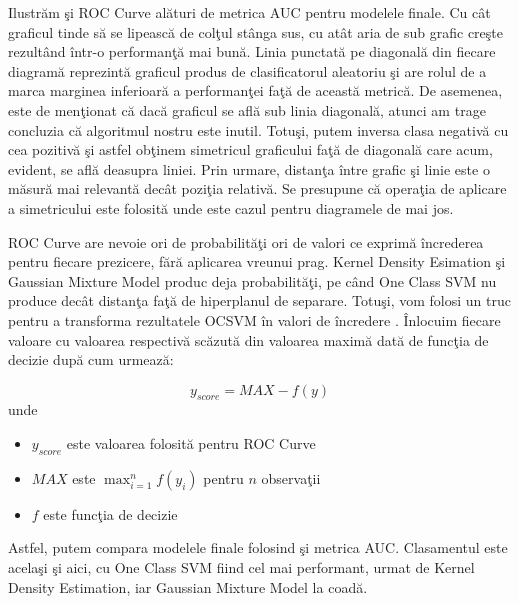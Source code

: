 Ilustrăm şi ROC Curve alături de metrica AUC pentru modelele finale. Cu cât graficul 
tinde să se lipească de colţul stânga sus, cu atât aria de sub grafic creşte rezultând 
într-o performanţă mai bună. Linia punctată pe diagonală 
din fiecare diagramă reprezintă graficul produs de clasificatorul aleatoriu şi are rolul
de a marca marginea inferioară a performanţei faţă de această metrică. De asemenea, este 
de menţionat că dacă graficul se află sub linia diagonală, atunci am trage concluzia că
algoritmul nostru este inutil. Totuşi, putem inversa clasa negativă cu cea pozitivă şi 
astfel obţinem simetricul graficului faţă de diagonală care acum, evident, se află deasupra
liniei. Prin urmare, distanţa între grafic şi linie este o măsură mai relevantă decât poziţia
relativă. Se presupune că operaţia de aplicare a simetricului este folosită unde este cazul 
pentru diagramele de mai jos.

ROC Curve are nevoie ori de probabilităţi ori de valori ce exprimă încrederea pentru fiecare 
prezicere, fără aplicarea vreunui prag. Kernel Density Esimation şi Gaussian Mixture Model 
produc deja probabilităţi, pe când One Class SVM nu produce decât distanţa faţă de hiperplanul
de separare. Totuşi, vom folosi un truc pentru a transforma rezultatele OCSVM în valori 
de încredere \cite{stackoverflow-auc}. Înlocuim fiecare valoare cu valoarea respectivă scăzută din valoarea maximă
dată de funcţia de decizie după cum urmează:

$$y_{score} = MAX - f(y)$$
unde 

\begin{itemize}
    \item $y_{score}$ este valoarea folosită pentru ROC Curve
    \item $MAX$ este $\max_{i=1}^{n} f(y_{i})$ pentru $n$ observaţii
    \item $f$ este funcţia de decizie 
\end{itemize}

Astfel, putem compara modelele finale folosind şi metrica AUC. Clasamentul este acelaşi şi aici,
cu One Class SVM fiind cel mai performant, urmat de Kernel Density Estimation, iar Gaussian Mixture
Model la coadă.

